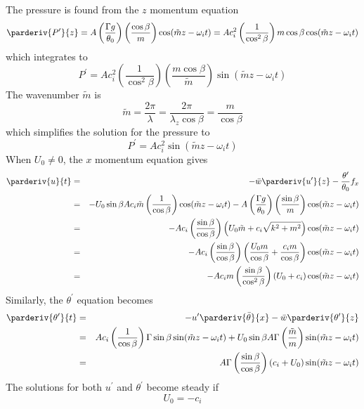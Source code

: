 \documentclass[12pt]{article}
\begin{document}
The pressure is found from the $z$ momentum equation
%
\begin{equation}
\parderiv{P^\prime}{z} = A\left(\frac{\Gamma g}{\theta_0}\right)
\left(\frac{\cos\beta}{m}\right)\cos(\tilde{m}z-\omega_i t) =
A c_i^2\left(\frac{1}{\cos^2\beta}\right)m\cos\beta
\cos(\tilde{m}z-\omega_i t)
\end{equation}
%
which integrates to
%
\begin{equation}
P^\prime = A c_i^2\left(\frac{1}{\cos^2\beta}\right)
\left(\frac{m\cos\beta}{\tilde{m}}\right)
\sin(\tilde{m}z-\omega_i t)
\end{equation}
%
The wavenumber $\tilde{m}$ is
%
\begin{equation}
\tilde{m} = \frac{2\pi}{\lambda} = \frac{2\pi}{\lambda_z\cos\beta} =
\frac{m}{\cos\beta}
\end{equation}
%
which simplifies the solution for the pressure to
%
\begin{equation}
P^\prime = A c_i^2 \sin(\tilde{m}z-\omega_i t)
\end{equation}
%
When $U_0\neq 0$, the $x$ momentum equation gives
%
\begin{eqnarray*}
\parderiv{u}{t} & = & -\bar{w}\parderiv{u^\prime}{z} - 
                      \frac{\theta^\prime}{\theta_0}f_x\\
& = & -U_0\sin\beta A c_i \tilde{m} \left(\frac{1}{\cos\beta}\right)
\cos(\tilde{m}z-\omega_i t) - A\left(\frac{\Gamma g}{\theta_0}\right)
\left(\frac{\sin\beta}{m}\right)\cos(\tilde{m}z-\omega_i t)\\
& = & -A c_i\left(\frac{\sin\beta}{\cos\beta}\right)\left( U_0\tilde{m} +
c_i\sqrt{k^2+m^2} \right)\cos(\tilde{m}z-\omega_i t)\\
& = & -A c_i \left(\frac{\sin\beta}{\cos\beta}\right)\left(
\frac{U_0 m}{\cos\beta} + \frac{c_i m}{\cos\beta}\right)
\cos(\tilde{m}z-\omega_i t)\\
& = & -A c_i m\left(\frac{\sin\beta}{\cos^2\beta}\right)
\left( U_0 + c_i\right) \cos(\tilde{m}z-\omega_i t)
\end{eqnarray*}
%
Similarly, the $\theta^\prime$ equation becomes
%
\begin{eqnarray*}
\parderiv{\theta^\prime}{t} & = & -u^\prime\parderiv{\bar{\theta}}{x}
-\bar{w}\parderiv{\theta^\prime}{z}\\
& = & A c_i \left(\frac{1}{\cos\beta}\right)\Gamma\sin\beta\sin(\tilde{m}z-\omega_i t) +
U_0\sin\beta A \Gamma \left(\frac{\tilde{m}}{m}\right)
\sin(\tilde{m}z-\omega_i t)\\
& = & A \Gamma \left(\frac{\sin\beta}{\cos\beta}\right)
\left(c_i + U_0\right) \sin(\tilde{m}z-\omega_i t)
\end{eqnarray*}
%
The solutions for both $u^\prime$ and $\theta^\prime$ become steady if 
%
\begin{equation}
U_0 = -c_i
\end{equation}
%
\end{document}
